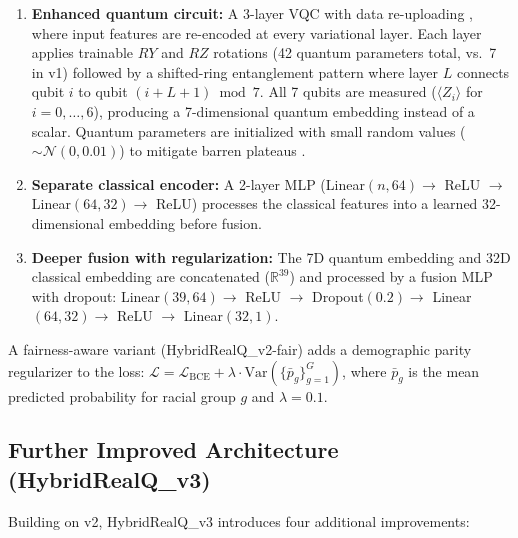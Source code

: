 \documentclass[12pt, letterpaper]{article}
\begin{document}
\begin{enumerate}
    \item \textbf{Enhanced quantum circuit:} A 3-layer VQC with data re-uploading \citep{perez2020}, where input features are re-encoded at every variational layer. Each layer applies trainable $RY$ and $RZ$ rotations (42 quantum parameters total, vs.\ 7 in v1) followed by a shifted-ring entanglement pattern where layer $L$ connects qubit $i$ to qubit $(i + L + 1) \bmod 7$. All 7 qubits are measured ($\langle Z_i \rangle$ for $i = 0, \ldots, 6$), producing a 7-dimensional quantum embedding instead of a scalar. Quantum parameters are initialized with small random values ($\sim \mathcal{N}(0, 0.01)$) to mitigate barren plateaus \citep{grant2019}.

    \item \textbf{Separate classical encoder:} A 2-layer MLP (Linear$(n, 64) \rightarrow$ ReLU $\rightarrow$ Linear$(64, 32) \rightarrow$ ReLU) processes the classical features into a learned 32-dimensional embedding before fusion.

    \item \textbf{Deeper fusion with regularization:} The 7D quantum embedding and 32D classical embedding are concatenated ($\mathbb{R}^{39}$) and processed by a fusion MLP with dropout: Linear$(39, 64) \rightarrow$ ReLU $\rightarrow$ Dropout$(0.2) \rightarrow$ Linear$(64, 32) \rightarrow$ ReLU $\rightarrow$ Linear$(32, 1)$.
\end{enumerate}

A fairness-aware variant (HybridRealQ\_v2-fair) adds a demographic parity regularizer to the loss: $\mathcal{L} = \mathcal{L}_{\text{BCE}} + \lambda \cdot \text{Var}(\{\bar{p}_g\}_{g=1}^{G})$, where $\bar{p}_g$ is the mean predicted probability for racial group $g$ and $\lambda = 0.1$.

\subsection{Further Improved Architecture (HybridRealQ\_v3)}
Building on v2, HybridRealQ\_v3 introduces four additional improvements:
\end{document}
